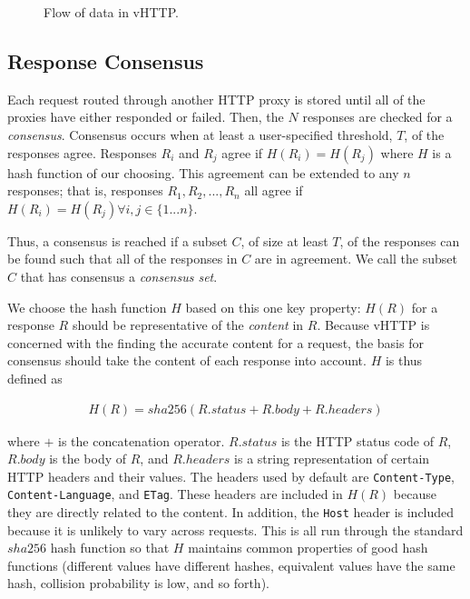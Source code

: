 \begin{figure}[b]
  \centering


  \caption{Flow of data in vHTTP.}
  \label{fig:proxy-data-flow}
\end{figure}

\subsection{Response Consensus}

Each request routed through another HTTP proxy is stored until all of the
proxies have either responded or failed. Then, the $N$ responses are checked
for a \textit{consensus}. Consensus occurs when at least a user-specified
threshold, $T$, of the responses agree. Responses $R_i$ and $R_j$ agree if
$H(R_i) = H(R_j)$ where $H$ is a hash function of our choosing. This agreement
can be extended to any $n$ responses; that is, responses $R_1, R_2, ..., R_n$
all agree if $H(R_i) = H(R_j) \forall i, j \in \{1...n\}$.

Thus, a consensus is reached if a subset $C$, of size at least $T$, of the
responses can be found such that all of the responses in $C$ are in agreement.
We call the subset $C$ that has consensus a \textit{consensus set}.

We choose the hash function $H$ based on this one key property: $H(R)$ for a
response $R$ should be representative of the \emph{content} in $R$. Because
vHTTP is concerned with the finding the accurate content for a request, the
basis for consensus should take the content of each response into account.
$H$ is thus defined as

\begin{align*}
  H(R) = sha256(R.status + R.body + R.headers)
\end{align*}

where $+$ is the concatenation operator. $R.status$ is the HTTP status code of
$R$, $R.body$ is the body of $R$, and $R.headers$ is a string representation
of certain HTTP headers and their values. The headers used by default are
\texttt{Content-Type}, \texttt{Content-Language}, and \texttt{ETag}. These
headers are included in $H(R)$ because they are directly related to the
content. In addition, the \texttt{Host} header is included because it is
unlikely to vary across requests. This is all run through the standard $sha256$
hash function so that $H$ maintains common properties of good hash functions
(different values have different hashes, equivalent values have the same hash,
collision probability is low, and so forth).

